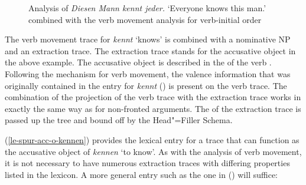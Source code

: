 \begin{figure}
\caption{\label{Abbildung-Diesen-Mann-kennt-jeder}Analysis of \emph{Diesen Mann kennt jeder.} `Everyone knows this man.' combined with the verb movement analysis for verb-initial order}
\end{figure}%

The verb movement trace for \emph{kennt} `knows' is combined with a nominative NP and an extraction trace.
The extraction trace stands for the accusative object in the above example. The accusative object is
described in the \subcatl of the verb . Following the mechanism for verb movement, the valence information that was originally contained
in the entry for \emph{kennt} () is present on the verb trace. The combination of the projection of the verb trace with
the extraction trace works in exactly the same way as for non-fronted arguments. The \slashv of the extraction trace is passed up the tree
and bound off by the Head"=Filler Schema.

(\ref{le-spur-acc-o-kennen}) provides the lexical entry for a trace
that can function as the accusative object of \emph{kennen} `to know'. As with the analysis of verb movement, it is not necessary to have numerous extraction traces with differing properties 
listed in the lexicon. A more general entry such as the one in () will suffice:

